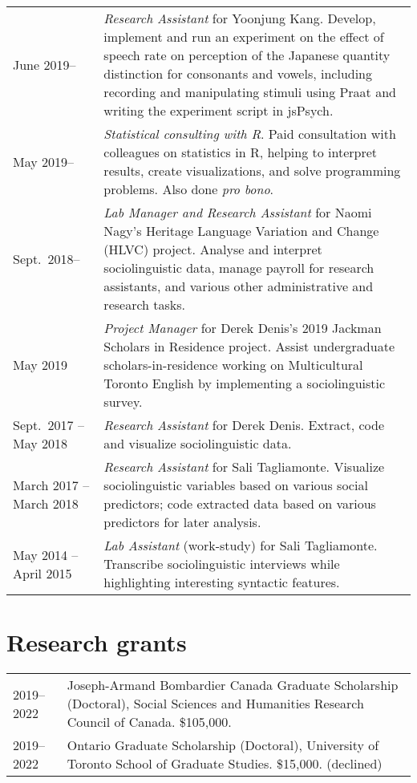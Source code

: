 \documentclass[letterpaper]{article}
\begin{document}
\begin{longtable}{p{}p{}}

    June 2019-- & \textit{Research Assistant} for Yoonjung Kang.
    Develop, implement and run an experiment on the effect of speech rate on
    perception of the Japanese quantity distinction for consonants and vowels,
    including recording and manipulating stimuli using Praat and writing the
    experiment script in jsPsych.
    \\

    May 2019-- & \textit{Statistical consulting with R}.
    Paid consultation with colleagues on statistics in R, helping to interpret
    results, create visualizations, and solve programming problems.
    Also done \emph{pro bono}.
    \\

    Sept.\ 2018-- & \textit{Lab Manager and Research Assistant} for Naomi
    Nagy's Heritage Language Variation and Change (HLVC) project.
    Analyse and interpret sociolinguistic data,
    manage payroll for research assistants,
    and various other administrative and research tasks.
    \\

    May 2019 & \textit{Project Manager} for Derek Denis's 2019 Jackman
    Scholars in Residence project.
    Assist undergraduate scholars-in-residence working on Multicultural
    Toronto English by implementing a sociolinguistic survey.
    \\

    Sept.\ 2017 -- May 2018 & \textit{Research Assistant} for Derek Denis.
    Extract, code and visualize sociolinguistic data.
    \\

    March 2017 -- March 2018 & \textit{Research Assistant} for Sali Tagliamonte.
    Visualize sociolinguistic variables based on various social predictors; code
    extracted data based on various predictors for later analysis.
    \\

    May 2014 -- April 2015 & \textit{Lab Assistant} (work-study) for Sali
    Tagliamonte.
    Transcribe sociolinguistic interviews while highlighting
    interesting syntactic features.
    \\

\end{longtable}

\section*{Research grants}
\begin{longtable}{p{}p{}}
    2019--2022 & Joseph-Armand Bombardier Canada Graduate Scholarship
    (Doctoral), Social Sciences and Humanities Research Council of Canada.
    \$105,000. \\
    2019--2022 & Ontario Graduate Scholarship (Doctoral), University of Toronto
    School of Graduate Studies.
    \$15,000. (declined) \\
\end{longtable}
\end{document}
